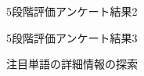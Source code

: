 \documentclass[syuuron]{kuee}
\begin{document}
		\begin{figure}
			\begin{center}
			\end{center}
			\caption{5段階評価アンケート結果2}
	  		\label{fig:res8}
		\end{figure}
		\begin{figure}
			\begin{center}
			\end{center}
			\caption{5段階評価アンケート結果3}
	  		\label{fig:res9}
		\end{figure}
		\begin{figure}
			\begin{center}
			\end{center}
			\caption{注目単語の詳細情報の探索}
	  		\label{fig:cas1}
		\end{figure}
\end{document}
